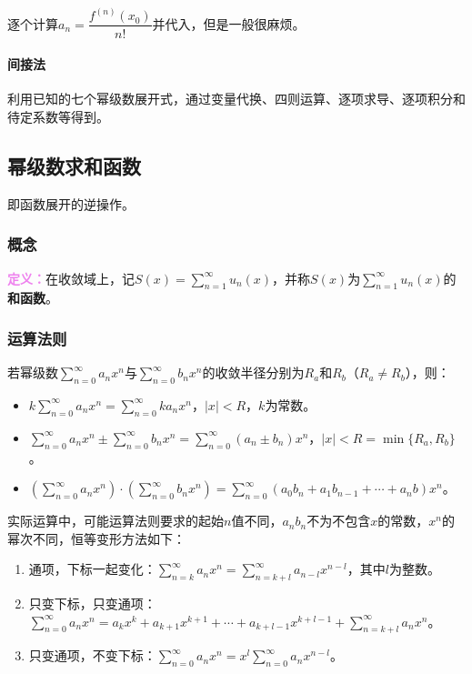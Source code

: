 逐个计算$a_n=\dfrac{f^{(n)}(x_0)}{n!}$并代入，但是一般很麻烦。

\paragraph{间接法} \leavevmode \medskip

利用已知的七个幂级数展开式，通过变量代换、四则运算、逐项求导、逐项积分和待定系数等得到。

\subsection{幂级数求和函数}

即函数展开的逆操作。

\subsubsection{概念}

\textcolor{violet}{\textbf{定义：}}在收敛域上，记$S(x)=\sum\limits_{n=1}^\infty u_n(x)$，并称$S(x)$为$\sum\limits_{n=1}^\infty u_n(x)$的\textbf{和函数}。

\subsubsection{运算法则}

若幂级数$\sum\limits_{n=0}^\infty a_nx^n$与$\sum\limits_{n=0}^\infty b_nx^n$的收敛半径分别为$R_a$和$R_b$（$R_a\neq R_b$），则：

\begin{itemize}
    \item $k\sum\limits_{n=0}^\infty a_nx^n=\sum\limits_{n=0}^\infty ka_nx^n$，$\vert x\vert<R$，$k$为常数。
    \item $\sum\limits_{n=0}^\infty a_nx^n\pm\sum\limits_{n=0}^\infty b_nx^n=\sum\limits_{n=0}^\infty (a_n\pm b_n)x^n$，$\vert x\vert<R=\min\{R_a,R_b\}$。
    \item $(\sum\limits_{n=0}^\infty a_nx^n)\cdot(\sum\limits_{n=0}^\infty b_nx^n)=\sum\limits_{n=0}^\infty(a_0b_n+a_1b_{n-1}+\cdots+a_nb)x^n$。
\end{itemize}

实际运算中，可能运算法则要求的起始$n$值不同，$a_nb_n$不为不包含$x$的常数，$x^n$的幂次不同，恒等变形方法如下：

\begin{enumerate}
    \item 通项，下标一起变化：$\sum\limits_{n=k}^\infty a_nx^n=\sum\limits_{n=k+l}^\infty a_{n-l}x^{n-l}$，其中$l$为整数。
    \item 只变下标，只变通项：$\sum\limits_{n=0}^\infty a_nx^n=a_kx^k+a_{k+1}x^{k+1}+\cdots+a_{k+l-1}x^{k+l-1}+\sum\limits_{n=k+l}^\infty a_nx^n$。
    \item 只变通项，不变下标：$\sum\limits_{n=0}^\infty a_nx^n=x^l\sum\limits_{n=0}^\infty a_nx^{n-l}$。
\end{enumerate}

